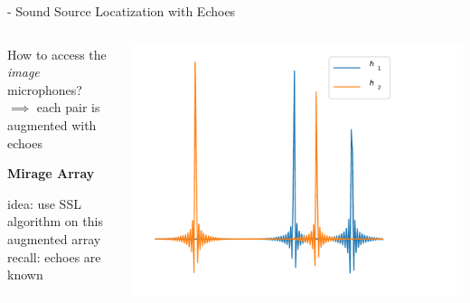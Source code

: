 \begin{frame}{\mirage - Sound Source Locatization with Echoes}
    \vfill

    \begin{columns}

        \begin{column}{0.5\textwidth}
            \begin{block}{How to access the \textit{image} microphones?}
                \\$\implies$ each pair is augmented with echoes
            \end{block}
            \begin{center}
                \textcolor{myred}{\textbf{Mirage Array}}
            \end{center}

            idea: use SSL algorithm on this augmented array
            \\recall: echoes are known
        \end{column}

        \begin{column}{0.5\textwidth}
            \centering
            \includegraphics[width=\textwidth]{figures/rirs1.pdf}
        \end{column}
    \end{columns}


\end{frame}

